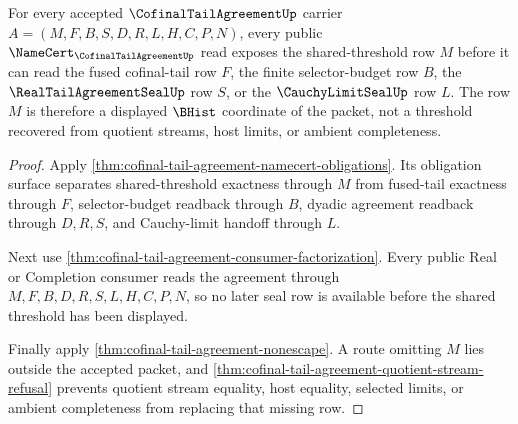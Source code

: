 \begin{theorem}
\label{thm:cofinal-tail-agreement-shared-threshold-exposure}
For every accepted $\CofinalTailAgreementUp$ carrier $A=(M,F,B,S,D,R,L,H,C,P,N)$, every public $\NameCert_{\CofinalTailAgreementUp}$ read exposes the shared-threshold row $M$ before it can read the fused cofinal-tail row $F$, the finite selector-budget row $B$, the $\RealTailAgreementSealUp$ row $S$, or the $\CauchyLimitSealUp$ row $L$. The row $M$ is therefore a displayed $\BHist$ coordinate of the packet, not a threshold recovered from quotient streams, host limits, or ambient completeness.
\end{theorem}
\begin{proof}
Apply \autoref{thm:cofinal-tail-agreement-namecert-obligations}. Its obligation surface separates shared-threshold exactness through $M$ from fused-tail exactness through $F$, selector-budget readback through $B$, dyadic agreement readback through $D,R,S$, and Cauchy-limit handoff through $L$.

Next use \autoref{thm:cofinal-tail-agreement-consumer-factorization}. Every public Real or Completion consumer reads the agreement through $M,F,B,D,R,S,L,H,C,P,N$, so no later seal row is available before the shared threshold has been displayed.

Finally apply \autoref{thm:cofinal-tail-agreement-nonescape}. A route omitting $M$ lies outside the accepted packet, and \autoref{thm:cofinal-tail-agreement-quotient-stream-refusal} prevents quotient stream equality, host equality, selected limits, or ambient completeness from replacing that missing row.
\end{proof}

